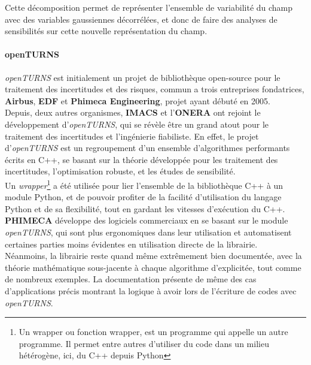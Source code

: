 \documentclass[a4paper,10pt]{article}
\begin{document}
Cette décomposition permet de représenter l'ensemble de variabilité du champ avec des variables gaussiennes décorrélées, et donc de faire des analyses de sensibilités sur cette nouvelle représentation du champ.

\paragraph{openTURNS\\}
\emph{openTURNS} est initialement un projet de bibliothèque open-source pour le traitement des incertitudes et des risques, commun a trois entreprises fondatrices, \textbf{Airbus}, \textbf{EDF} et \textbf{Phimeca Engineering}, projet ayant débuté en 2005. \\
Depuis, deux autres organismes, \textbf{IMACS} et l'\textbf{ONERA} ont rejoint le développement d'\emph{openTURNS}, qui se révèle être un grand atout pour le traitement des incertitudes et l’ingénierie fiabiliste.
En effet, le projet d'\emph{openTURNS} est un regroupement d'un ensemble d'algorithmes performants écrits en C++, se basant sur la théorie développée pour les traitement des incertitudes, l'optimisation robuste, et les études de sensibilité.\\ 
Un \textit{wrapper}\footnote{Un wrapper ou fonction wrapper, est un programme qui appelle un autre programme. Il permet entre autres d'utiliser du code dans un milieu hétérogène, ici, du C++ depuis Python} a été utilisée pour lier l'ensemble de la bibliothèque C++ à un module Python, et de pouvoir profiter de la facilité d'utilisation du langage Python et de sa flexibilité, tout en gardant les vitesses d’exécution du C++.\\
\textbf{PHIMECA} développe des logiciels commerciaux en se basant sur le module \emph{openTURNS}, qui sont plus ergonomiques dans leur utilisation et automatisent certaines parties moins évidentes en utilisation directe de la librairie. \\
Néanmoins, la librairie reste quand même extrêmement bien documentée, avec la théorie mathématique sous-jacente à chaque algorithme d'explicitée, tout comme de nombreux exemples. La documentation présente de même des cas d'applications précis montrant la logique à avoir lors de l'écriture de codes avec \emph{openTURNS}.
\newpage
\end{document}
